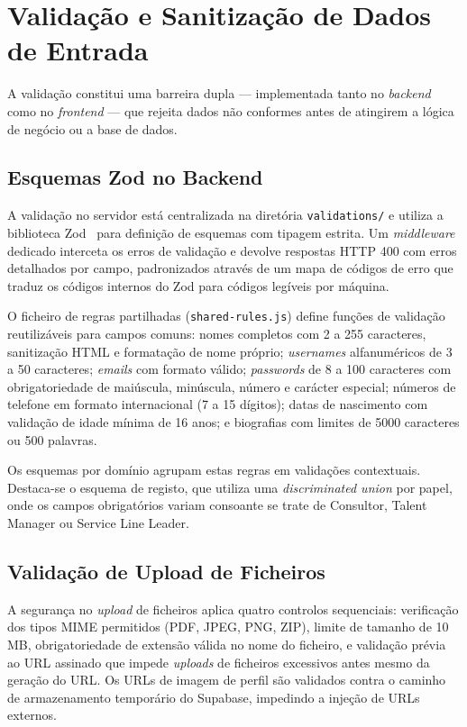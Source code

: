 \documentclass[12pt,a4paper]{report}
\begin{document}
\section{Validação e Sanitização de Dados de Entrada}

A validação constitui uma barreira dupla --- implementada tanto no \textit{backend} como no \textit{frontend} --- que rejeita dados não conformes antes de atingirem a lógica de negócio ou a base de dados.

\subsection{Esquemas Zod no Backend}

A validação no servidor está centralizada na diretória \texttt{validations/} e utiliza a biblioteca Zod~\cite{zod} para definição de esquemas com tipagem estrita. Um \textit{middleware} dedicado interceta os erros de validação e devolve respostas HTTP 400 com erros detalhados por campo, padronizados através de um mapa de códigos de erro que traduz os códigos internos do Zod para códigos legíveis por máquina.

O ficheiro de regras partilhadas (\texttt{shared-rules.js}) define funções de validação reutilizáveis para campos comuns: nomes completos com 2 a 255 caracteres, sanitização HTML e formatação de nome próprio; \textit{usernames} alfanuméricos de 3 a 50 caracteres; \textit{emails} com formato válido; \textit{passwords} de 8 a 100 caracteres com obrigatoriedade de maiúscula, minúscula, número e carácter especial; números de telefone em formato internacional (7 a 15 dígitos); datas de nascimento com validação de idade mínima de 16 anos; e biografias com limites de 5000 caracteres ou 500 palavras.

Os esquemas por domínio agrupam estas regras em validações contextuais. Destaca-se o esquema de registo, que utiliza uma \textit{discriminated union} por papel, onde os campos obrigatórios variam consoante se trate de Consultor, Talent Manager ou Service Line Leader.

\subsection{Validação de Upload de Ficheiros}

A segurança no \textit{upload} de ficheiros aplica quatro controlos sequenciais: verificação dos tipos MIME permitidos (PDF, JPEG, PNG, ZIP), limite de tamanho de 10\,MB, obrigatoriedade de extensão válida no nome do ficheiro, e validação prévia ao URL assinado que impede \textit{uploads} de ficheiros excessivos antes mesmo da geração do URL. Os URLs de imagem de perfil são validados contra o caminho de armazenamento temporário do Supabase, impedindo a injeção de URLs externos.
\end{document}
